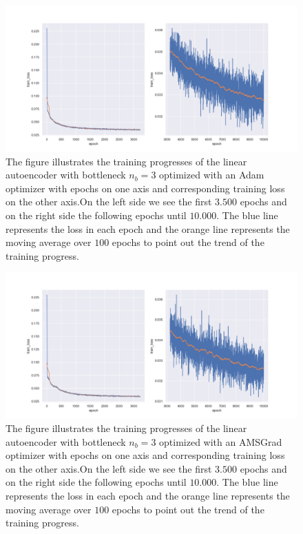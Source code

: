 \begin{figure}
\begin{center}
\includegraphics[width=\linewidth]{linear_AE_3d_adam_training_progress}
\end{center}
\caption{The figure illustrates the training progresses of the linear autoencoder with bottleneck $n_b=3$ optimized with an Adam optimizer with epochs on one axis and corresponding training loss on the other axis.On the left side we see the first $3.500$ epochs and on the right side the following epochs until $10.000$. The blue line represents the loss in each epoch and the orange line represents the moving average over $100$ epochs to point out the trend of the training progress.}\label{fig:linear_AE_3d_adam_training_progress}
\end{figure}


\begin{figure}
\begin{center}
\includegraphics[width=\linewidth]{linear_AE_3d_amsgrad_training_progress}
\end{center}
\caption{The figure illustrates the training progresses of the linear autoencoder with bottleneck $n_b=3$ optimized with an AMSGrad optimizer with epochs on one axis and corresponding training loss on the other axis.On the left side we see the first $3.500$ epochs and on the right side the following epochs until $10.000$. The blue line represents the loss in each epoch and the orange line represents the moving average over $100$ epochs to point out the trend of the training progress.}\label{fig:linear_AE_3d_amsgrad_training_progress}
\end{figure}


